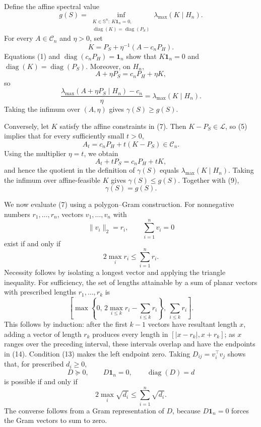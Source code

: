Define the affine spectral value
\[
g(S)=\inf_{\substack{K\in\mathbb S^n:\ K\mathbf1_n=0,\\
\operatorname{diag}(K)=\operatorname{diag}(P_S)}}
\lambda_{\max}(K\mid H_n).
\tag{7}
\]
For every \(A\in\mathcal C_n\) and \(\eta>0\), set
\[
K=P_S+\eta^{-1}(A-c_nP_H).
\tag{8}
\]
Equations (1) and \(\operatorname{diag}(c_nP_H)=\mathbf1_n\) show that \(K\mathbf1_n=0\) and \(\operatorname{diag}(K)=\operatorname{diag}(P_S)\).  Moreover, on \(H_n\),
\[
A+\eta P_S=c_nP_H+\eta K,
\]
so
\[
\frac{\lambda_{\max}(A+\eta P_S\mid H_n)-c_n}{\eta}
=\lambda_{\max}(K\mid H_n).
\tag{9}
\]
Taking the infimum over \((A,\eta)\) gives \(\gamma(S)\geq g(S)\).

Conversely, let \(K\) satisfy the affine constraints in (7).  Then \(K-P_S\in\mathcal L\), so (5) implies that for every sufficiently small \(t>0\),
\[
A_t=c_nP_H+t(K-P_S)\in\mathcal C_n.
\tag{10}
\]
Using the multiplier \(\eta=t\), we obtain
\[
A_t+tP_S=c_nP_H+tK,
\]
and hence the quotient in the definition of \(\gamma(S)\) equals \(\lambda_{\max}(K\mid H_n)\).  Taking the infimum over affine-feasible \(K\) gives \(\gamma(S)\leq g(S)\).  Together with (9),
\[
\gamma(S)=g(S).
\tag{11}
\]

We now evaluate (7) using a polygon--Gram construction.  For nonnegative numbers \(r_1,\ldots,r_n\), vectors \(v_1,\ldots,v_n\) with
\[
\|v_i\|_2=r_i,
\qquad
\sum_{i=1}^n v_i=0
\tag{12}
\]
exist if and only if
\[
2\max_i r_i\leq\sum_{i=1}^n r_i.
\tag{13}
\]
Necessity follows by isolating a longest vector and applying the triangle inequality.  For sufficiency, the set of lengths attainable by a sum of planar vectors with prescribed lengths \(r_1,\ldots,r_k\) is
\[
\left[
\max\left\{0,\,2\max_{i\leq k}r_i-\sum_{i\leq k}r_i\right\},
\ \sum_{i\leq k}r_i
\right].
\tag{14}
\]
This follows by induction: after the first \(k-1\) vectors have resultant length \(x\), adding a vector of length \(r_k\) produces every length in \([|x-r_k|,x+r_k]\); as \(x\) ranges over the preceding interval, these intervals overlap and have the endpoints in (14).  Condition (13) makes the left endpoint zero.  Taking \(D_{ij}=v_i^\top v_j\) shows that, for prescribed \(d_i\geq0\),
\[
D\succeq0,
\qquad
D\mathbf1_n=0,
\qquad
\operatorname{diag}(D)=d
\tag{15}
\]
is possible if and only if
\[
2\max_i\sqrt{d_i}\leq\sum_{i=1}^n\sqrt{d_i}.
\tag{16}
\]
The converse follows from a Gram representation of \(D\), because \(D\mathbf1_n=0\) forces the Gram vectors to sum to zero.

